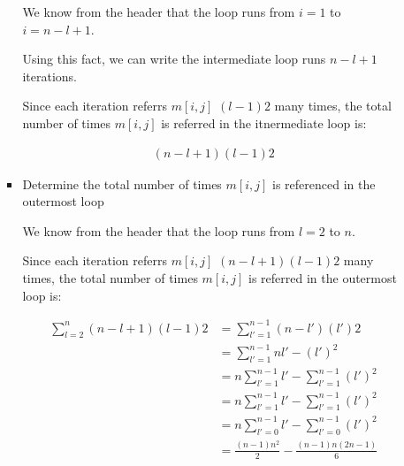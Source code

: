 \documentclass[12pt]{article}
\begin{document}
\begin{enumerate}[1.]
\begin{enumerate}[1.]
\begin{itemize}
            \begin{mdframed}
            We know from the header that the loop runs from $i = 1$ to $i = n - l + 1$.

            \bigskip

            Using this fact, we can write the intermediate loop runs $n - l + 1$ iterations.

            \bigskip

            Since each iteration referrs $m[i,j]$ $(l - 1)2$ many times, the total number
            of times $m[i,j]$ is referred in the itnermediate loop is:

            \bigskip

            \begin{align}
                (n - l + 1)(l - 1)2
            \end{align}

            \end{mdframed}

            \item Determine the total number of times $m[i,j]$ is referenced in the
            outermost loop

            \bigskip

            \begin{mdframed}
            We know from the header that the loop runs from $l = 2$ to $n$.

            \bigskip

            Since each iteration referrs $m[i,j]$ $(n - l + 1)(l - 1)2$ many times, the total number
            of times $m[i,j]$ is referred in the outermost loop is:

            \bigskip

            \begin{align}
                \sum\limits_{l=2}^{n} (n - l + 1)(l - 1)2 &= \sum\limits_{l'=1}^{n-1} (n - l')(l')2\\
                &= \sum\limits_{l'=1}^{n-1} nl' - (l')^2\\
                &= n \sum\limits_{l'=1}^{n-1} l' - \sum\limits_{l'=1}^{n-1} (l')^2\\
                &= n \sum\limits_{l'=1}^{n-1} l' - \sum\limits_{l'=1}^{n-1} (l')^2\\
                &= n \sum\limits_{l'=0}^{n-1} l' - \sum\limits_{l'=0}^{n-1} (l')^2\\
                &= \frac{(n-1)n^2}{2} - \frac{(n-1)n(2n-1)}{6}\\
            \end{align}


\end{mdframed}
\end{itemize}
\end{enumerate}
\end{enumerate}
\end{document}
